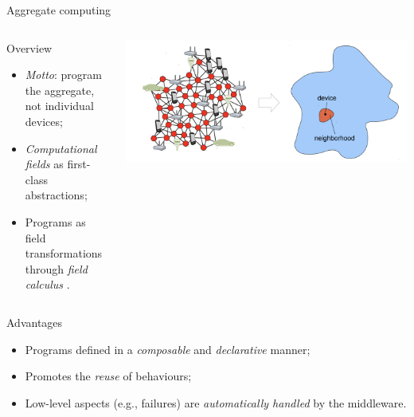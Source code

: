 \documentclass[presentation]{beamer}\mode<presentation>{\usetheme{AMSBolognaFC}}
\begin{document}
\begin{frame}{Aggregate computing}
\begin{columns}
	\begin{column}{0.55\textwidth}
		\begin{block}{Overview}
			\begin{itemize}
				\item \emph{Motto}: program the aggregate, not individual devices;
				\item \emph{Computational fields} \cite{mamei2004cofields, viroli2019distributed} as first-class abstractions;
				\item Programs as field transformations through \emph{field calculus} \cite{viroli2016higher}.
			\end{itemize}
		\end{block}
	\end{column}
	\begin{column}{0.45\textwidth}
	\includegraphics[width=\textwidth]{img/ac.png}
	\end{column}
\end{columns}
	
\centering

\begin{alertblock}{Advantages}
	 	\begin{itemize}
	 		\item Programs defined in a \emph{composable} and \emph{declarative} manner;
	 		\item Promotes the \emph{reuse} of behaviours;
	 		\item Low-level aspects (e.g., failures) are \emph{automatically handled} by the middleware.
	 	\end{itemize}
\end{alertblock}


\end{frame}
\end{document}
